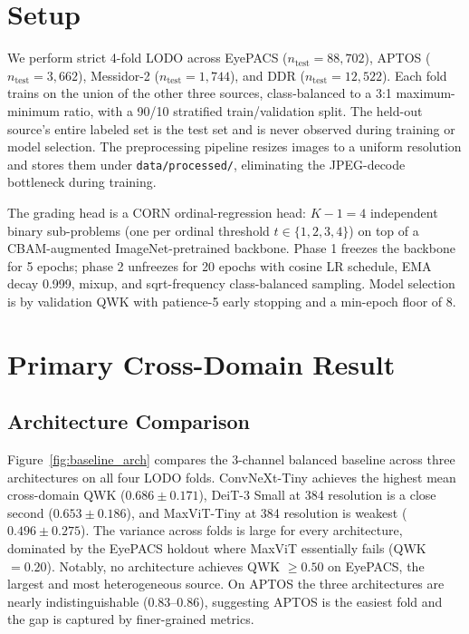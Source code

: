 \documentclass[11pt]{article}
\begin{document}
\begin{abstract}
confirming the prior-literature Mild-class failure mode (Poyrazer et al., 2026) on the CORN head. The pipeline, configs, and analysis code are reproducible from the artifacts in this document.
\end{abstract}

\section{Setup}

We perform strict 4-fold LODO across EyePACS ($n_{\mathrm{test}}=88{,}702$), APTOS ($n_{\mathrm{test}}=3{,}662$), Messidor-2 ($n_{\mathrm{test}}=1{,}744$), and DDR ($n_{\mathrm{test}}=12{,}522$). Each fold trains on the union of the other three sources, class-balanced to a 3:1 maximum-minimum ratio, with a 90/10 stratified train/validation split. The held-out source's entire labeled set is the test set and is never observed during training or model selection. The preprocessing pipeline resizes images to a uniform resolution and stores them under \texttt{data/processed/}, eliminating the JPEG-decode bottleneck during training.

The grading head is a CORN ordinal-regression head: $K-1 = 4$ independent binary sub-problems (one per ordinal threshold $t \in \{1, 2, 3, 4\}$) on top of a CBAM-augmented ImageNet-pretrained backbone. Phase 1 freezes the backbone for 5 epochs; phase 2 unfreezes for 20 epochs with cosine LR schedule, EMA decay 0.999, mixup, and sqrt-frequency class-balanced sampling. Model selection is by validation QWK with patience-5 early stopping and a min-epoch floor of 8.

\section{Primary Cross-Domain Result}

\subsection{Architecture Comparison}

Figure~\ref{fig:baseline_arch} compares the 3-channel balanced baseline across three architectures on all four LODO folds. ConvNeXt-Tiny achieves the highest mean cross-domain QWK ($0.686 \pm 0.171$), DeiT-3 Small at 384 resolution is a close second ($0.653 \pm 0.186$), and MaxViT-Tiny at 384 resolution is weakest ($0.496 \pm 0.275$). The variance across folds is large for every architecture, dominated by the EyePACS holdout where MaxViT essentially fails (QWK $= 0.20$). Notably, no architecture achieves QWK $\geq 0.50$ on EyePACS, the largest and most heterogeneous source. On APTOS the three architectures are nearly indistinguishable ($0.83$--$0.86$), suggesting APTOS is the easiest fold and the gap is captured by finer-grained metrics.
\end{document}
